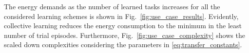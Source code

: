 The energy demands as the number of learned tasks increases for all the considered learning schemes is shown in  Fig.~\ref{fig:use_case_results}. Evidently, collective learning reduces the energy consumption to the minimum in the least number of trial episodes. Furthermore, Fig.~\ref{fig:use_case_complexity} shows the scaled down complexities considering the parameters in \eqref{eq:transfer_constants}.

